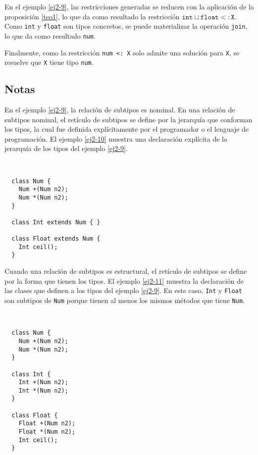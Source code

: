 En el ejemplo \ref{ej2-9}, las restricciones generadas se reducen con la aplicación de la proposición \ref{teo1}, lo que da como resultado la restricción $\mathtt{int\sqcup float <: X}$. Como \texttt{int} y \texttt{float} son tipos concretos, se puede materializar la operación \texttt{join}, lo que da como resultado \texttt{num}.

Finalmente, como la restricción \texttt{num <: X} solo admite una solución para \texttt{X}, se resuelve que \texttt{X} tiene tipo \texttt{num}.

\subsection*{Notas}

En el ejemplo \ref{ej2-9}, la relación de subtipos es nominal. En una relación de subtipos nominal, el retículo de subtipos se define por la jerarquía que conforman los tipos, la cual fue definida explícitamente por el programador o el lenguaje de programación. El ejemplo \ref{ej2-10} muestra una declaración explícita de la jerarquía de los tipos del ejemplo \ref{ej2-9}.

\begin{ej} \ \\
  \normalfont
  \label{ej2-10}
\begin{lstlisting}
  class Num {
    Num +(Num n2);
    Num *(Num n2);
  }

  class Int extends Num { }

  class Float extends Num {
    Int ceil();
  }
\end{lstlisting}
\end{ej}

Cuando una relación de subtipos es estructural, el retículo de subtipos se define por la forma que tienen los tipos. El ejemplo \ref{ej2-11} muestra la declaración de las clases que definen a los tipos del ejemplo \ref{ej2-9}. En este caso, \texttt{Int} y \texttt{Float} son subtipos de \texttt{Num} porque tienen al menos los mismos métodos que tiene \texttt{Num}.

\begin{ej} \ \\
  \normalfont
  \label{ej2-11}
\begin{lstlisting}
  class Num {
    Num +(Num n2);
    Num *(Num n2);
  }

  class Int {
    Int +(Num n2);
    Int *(Num n2);
  }

  class Float {
    Float +(Num n2);
    Float *(Num n2);
    Int ceil();
  }
\end{lstlisting}
\end{ej}

